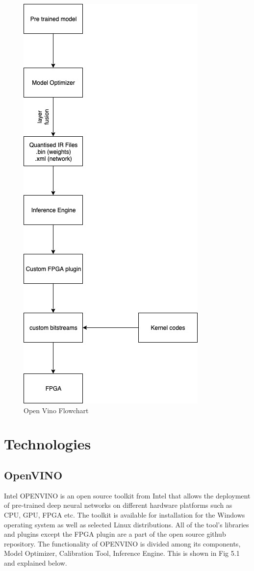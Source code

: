 \documentclass[titlepage]{report}
\begin{document}
\begin{figure}[h!]
    \centering
    \includegraphics[scale=0.65]{open_vino_flowchart.jpg}
    \caption{Open Vino Flowchart}
\end{figure}



\chapter{Technologies}

\section{OpenVINO}
Intel OPENVINO is an open source toolkit from Intel that allows the deployment of pre-trained deep neural networks on different hardware platforms such as CPU, GPU, FPGA etc. The toolkit is available for installation for the Windows operating system as well as selected Linux distributions. All of the tool's libraries and plugins except the FPGA plugin are a part of the open source github repository.
The functionality of OPENVINO is divided among its components, Model Optimizer, Calibration Tool,  Inference Engine. This is shown in Fig 5.1 and explained below. 
\end{document}

